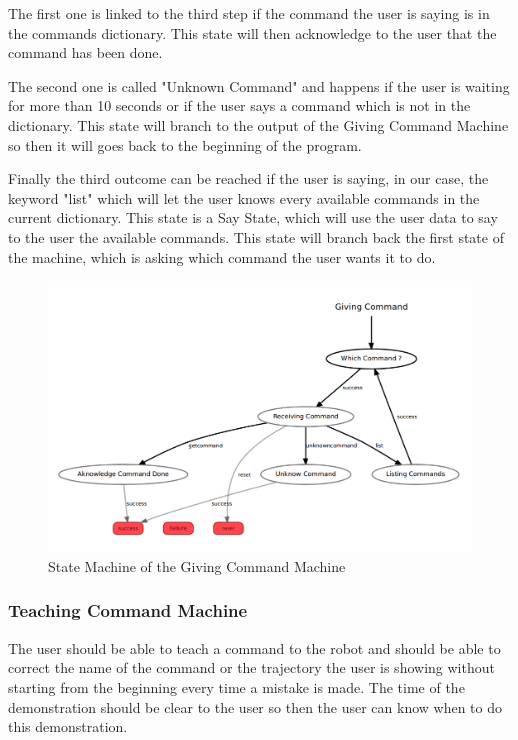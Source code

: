 The first one is linked to the third step if the command the user is saying is in the commands dictionary. This state will then acknowledge to the user that the command has been done.

The second one is called "Unknown Command" and happens if the user is waiting for more than 10 seconds or if the user says a command which is not in the dictionary. This state will branch to the output of the Giving Command Machine so then it will goes back to the beginning of the program. 

Finally the third outcome can be reached if the user is saying, in our case, the keyword "list" which will let the user knows every available commands in the current dictionary. This state is a Say State, which will use the user data to say to the user the available commands. This state will branch back the first state of the machine, which is asking which command the user wants it to do. 

 \begin{figure}
 \center
 \includegraphics[width=15cm]{img_SM/GivingCommandBranch.png}
 \caption{State Machine of the Giving Command Machine}
 \end{figure}

\subsubsection{Teaching Command Machine}
The user should be able to teach a command to the robot and should be able to correct the name of the command or the trajectory the user is showing without starting from the beginning every time a mistake is made. The time of the demonstration should be clear to the user so then the user can know when to do this demonstration.

